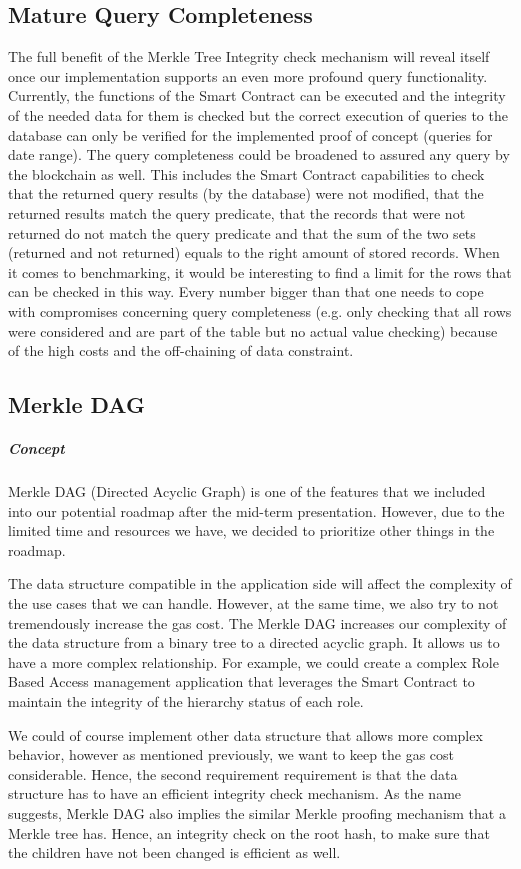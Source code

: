\subsection{Mature Query Completeness}
The full benefit of the Merkle Tree Integrity check mechanism will reveal itself once our implementation supports an even more profound query functionality. Currently, the functions of the Smart Contract can be executed and the integrity of the needed data for them is checked but the correct execution of queries to the database can only be verified for the implemented proof of concept (queries for date range). The query completeness could be broadened to assured any query by the blockchain as well. This includes the Smart Contract capabilities to check that the returned query results (by the database) were not modified, that the returned results match the query predicate, that the records that were not returned do not match the query predicate and that the sum of the two sets (returned and not returned) equals to the right amount of stored records.
When it comes to benchmarking, it would be interesting to find a limit for the rows that can be checked in this way. Every number bigger than that one needs to cope with compromises concerning query completeness (e.g. only checking that all rows were considered and are part of the table but no actual value checking) because of the high costs and the off-chaining of data constraint.

\subsection{Merkle DAG}
\subparagraph{Concept}
Merkle DAG (Directed Acyclic Graph) is one of the features that we included into our potential roadmap after the mid-term presentation. However, due to the limited time and resources we have, we decided to prioritize other things in the roadmap.

The data structure compatible in the application side will affect the complexity of the use cases that we can handle. However, at the same time, we also try to not tremendously increase the gas cost. The Merkle DAG increases our complexity of the data structure from a binary tree to a directed acyclic graph. It allows us to have a more complex relationship. For example, we could create a complex Role Based Access management application that leverages the Smart Contract to maintain the integrity of the hierarchy status of each role.

We could of course implement other data structure that allows more complex behavior, however as mentioned previously, we want to keep the gas cost considerable. Hence, the second requirement requirement is that the data structure has to have an efficient integrity check mechanism. As the name suggests, Merkle DAG also implies the similar Merkle proofing mechanism that a Merkle tree has. Hence, an integrity check on the root hash, to make sure that the children have not been changed is efficient as well.

